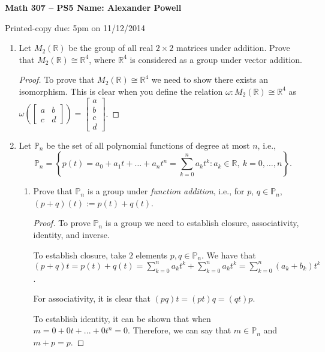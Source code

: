 \documentclass[a4paper]{article}
\newcommand{\bb}[1]{\mathbb{#1}}								%
\begin{document}
\textbf{Math 307 -- PS5 \hfill Name: Alexander Powell}

Printed-copy due: 5pm on 11/12/2014 

\begin{enumerate}[leftmargin=*, label=(\textbf{\arabic*})]
\item Let $M_2(\bb{R})$ be the group of all real $2 \times 2$ matrices under addition. Prove that $M_2(\bb{R}) \cong \bb{R}^4$, where $\bb{R}^4$ is considered as a group under vector addition. 

\begin{proof}
To prove that $M_2(\bb{R}) \cong \bb{R}^4$ we need to show there exists an isomorphism.  This is clear when you define the relation $\omega: M_2(\bb{R}) \cong \bb{R}^4$ as $\omega ( \begin{bmatrix} a & b \\ c & d \end{bmatrix} ) = \begin{bmatrix} a \\ b \\ c \\ d \end{bmatrix}$.  
\end{proof}


\item Let $\bb{P}_n$ be the set of all polynomial functions of degree at most $n$, i.e., 
\[ \bb{P}_n = \left\{ p(t) = a_0 + a_1 t + \dots + a_n t^n = \sum_{k=0}^n a_k t^k : a_k \in \bb{R},~k=0,\dots,n \right\}. \] 

\begin{enumerate}[leftmargin=*, label=(\textbf{\alph*})]
\item Prove that $\bb{P}_n$ is a group under \textit{function addition}, i.e., for $p$, $q \in \bb{P}_n$, $(p+q)(t) := p(t) + q(t)$.


\begin{proof}
To prove $\bb{P}_n$ is a group we need to establish closure, associativity, identity, and inverse.  

To establish closure, take $2$ elements $p,q \in \bb{P}_n$.  We have that $(p+q)t = p(t) + q(t) = \sum_{k=0}^n a_k t^k + \sum_{k=0}^n a_k t^k = \sum_{k=0}^n (a_k + b_k) t^k$.  

For associativity, it is clear that $(pq)t = (pt)q = (qt)p$.  

To establish identity, it can be shown that when $m = 0 + 0t + ... + 0t^{n} = 0$.  Therefore, we can say that $m \in \bb{P}_n$ and $m + p = p$.  


\end{proof}
\end{enumerate}
\end{enumerate}
\end{document}
